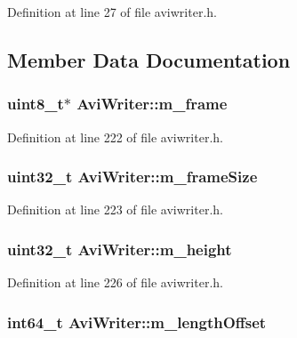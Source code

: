 Definition at line 27 of file aviwriter.\+h.



\subsection{Member Data Documentation}
\hypertarget{struct_avi_writer_a33e4f7155453be7208452436444ff5ad}{
\subsubsection[{m\+\_\+frame}]{\setlength{\rightskip}{0pt plus 5cm}uint8\+\_\+t$\ast$ Avi\+Writer\+::m\+\_\+frame}}\label{struct_avi_writer_a33e4f7155453be7208452436444ff5ad}


Definition at line 222 of file aviwriter.\+h.

\hypertarget{struct_avi_writer_a7f2b660e4563bd2e7c436b4c1025335e}{
\subsubsection[{m\+\_\+frame\+Size}]{\setlength{\rightskip}{0pt plus 5cm}uint32\+\_\+t Avi\+Writer\+::m\+\_\+frame\+Size}}\label{struct_avi_writer_a7f2b660e4563bd2e7c436b4c1025335e}


Definition at line 223 of file aviwriter.\+h.

\hypertarget{struct_avi_writer_a434bec11f6c2b920ed22221c7360b696}{
\subsubsection[{m\+\_\+height}]{\setlength{\rightskip}{0pt plus 5cm}uint32\+\_\+t Avi\+Writer\+::m\+\_\+height}}\label{struct_avi_writer_a434bec11f6c2b920ed22221c7360b696}


Definition at line 226 of file aviwriter.\+h.

\hypertarget{struct_avi_writer_ac9e2f767a0fa6f0ec0f90b9bc716b592}{
\subsubsection[{m\+\_\+length\+Offset}]{\setlength{\rightskip}{0pt plus 5cm}int64\+\_\+t Avi\+Writer\+::m\+\_\+length\+Offset}}\label{struct_avi_writer_ac9e2f767a0fa6f0ec0f90b9bc716b592}


